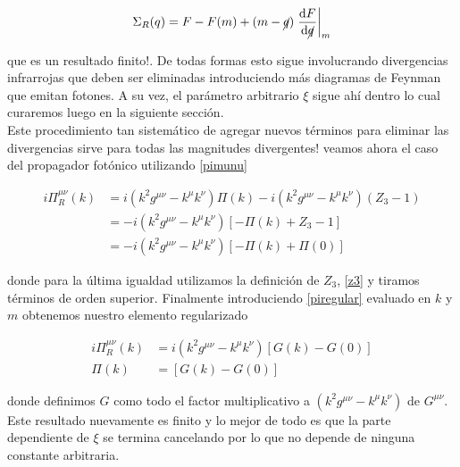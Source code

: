 \documentclass[tickz]{article}
\numberwithin{equation}{section}
\begin{document}
\begin{boxquation}
\begin{equation}\label{sigmarenormal}
\Sigma_R(q) = F-F(m) + \left(m -\cancel{q}\right) \left.\frac{\mathrm{d}F}{\mathrm{d}\cancel{q}}\right|_m 
\end{equation}
\end{boxquation}

que es un resultado finito!. De todas formas esto sigue involucrando divergencias infrarrojas que deben ser eliminadas introduciendo más diagramas de Feynman que emitan fotones. A su vez, el parámetro arbitrario $ \xi $ sigue ahí dentro lo cual curaremos luego en la siguiente sección.\\

Este procedimiento tan sistemático de agregar nuevos términos para eliminar las divergencias sirve para todas las magnitudes divergentes! veamos ahora el caso del propagador fotónico utilizando \ref{pimunu}

\begin{equation}\label{key}
\begin{aligned}
i \Pi_R^{\mu\nu}(k)&= i \left(k^2g^{\mu\nu} - k^{\mu}k^{\nu}\right) \Pi(k) -i \left(k^2g^{\mu\nu} - k^{\mu}k^{\nu}\right) \left( Z_3 -1\right)\\
&= -i \left(k^2g^{\mu\nu} - k^{\mu}k^{\nu}\right) \left[ -\Pi(k) + Z_3 -1\right]\\
&=-i \left(k^2g^{\mu\nu} - k^{\mu}k^{\nu}\right) \left[ -\Pi(k) + \Pi(0)\right]
\end{aligned}
\end{equation}

donde para la última igualdad utilizamos la definición de $ Z_3 $, \ref{z3} y tiramos términos de orden superior. Finalmente introduciendo \ref{piregular} evaluado en $ k $ y $ m $ obtenemos nuestro elemento regularizado

\begin{boxquation}
\begin{equation}\label{pirenormal}
\begin{aligned}
i\Pi_R^{\mu\nu}(k)&=  i \left(k^2g^{\mu\nu} - k^{\mu}k^{\nu}\right) \left[ G(k) - G(0)\right]\\
\Pi(k) &= \left[ G(k) - G(0)\right]
\end{aligned}
\end{equation}
\end{boxquation}
 
donde definimos $ G $ como todo el factor multiplicativo a $ \left(k^2g^{\mu\nu} - k^{\mu}k^{\nu}\right) $ de $ G^{\mu\nu} $. Este resultado nuevamente es finito y lo mejor de todo es que la parte dependiente de $ \xi $ se termina cancelando por lo que no depende de ninguna constante arbitraria.\\
\end{document}
